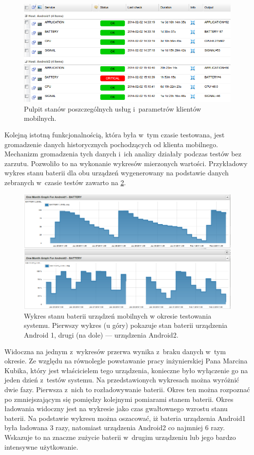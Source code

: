\begin{figure}[ht]
  \caption{Pulpit stanów poszczególnych usług i~parametrów klientów
    mobilnych.}
  \label{fig:criticalBat}
  \centering
\includegraphics[width=1\textwidth]{img/criticalBat.png}
\end{figure}

Kolejną istotną funkcjonalnością, która była w~tym czasie testowana,
jest gromadzenie danych historycznych pochodzących od klienta
mobilnego. Mechanizm gromadzenia tych danych i~ich analizy działały
podczas testów bez zarzutu. Pozwoliło to na wykonanie wykresów
mierzonych wartości. Przykładowy wykres stanu baterii dla obu urządzeń
wygenerowany na podstawie danych zebranych w~czasie testów zawarto na
\ref{fig:baterie}.
 
\begin{figure}[ht]
  \caption{Wykres stanu baterii urządzeń mobilnych w okresie
    testowania systemu. Pierwszy wykres (u góry) pokazuje stan baterii
    urządzenia Android 1, drugi (na dole) --- urządzenia Android2.}
  \label{fig:baterie}
  \centering
\includegraphics[width=1\textwidth]{img/battery.png}
\end{figure}

Widoczna na jednym z~wykresów przerwa wynika z~braku danych w~tym
okresie. Ze względu na równolegle powstawanie pracy inżynierskiej Pana
Marcina Kubika, który jest właścicielem tego urządzenia, konieczne było
wyłączenie go na jeden dzień z~testów systemu. Na przedstawionych
wykresach można wyróżnić dwie fazy. Pierwsza z~nich to rozładowywanie
baterii. Okres ten można rozpoznać po zmniejszającym się pomiędzy
kolejnymi pomiarami stanem baterii. Okres ładowania widoczny jest na
wykresie jako czas gwałtownego wzrostu stanu baterii. Na podstawie
wykresu można oszacować, iż bateria urządzenia Android1 była ładowana
3 razy, natomiast urządzenia Android2 co najmniej 6 razy. Wskazuje to
na znaczne zużycie baterii w~drugim urządzeniu lub jego bardzo
intensywne użytkowanie.

